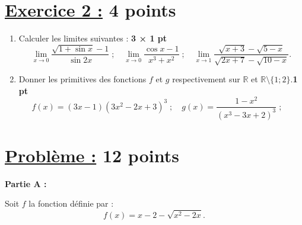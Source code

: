 \documentclass[12pt,a4paper]{article}
\begin{document}
\section*{\underline{Exercice 2 :} 4 points}

\begin{enumerate}
    \item Calculer les limites suivantes : \textbf{3 × 1 pt}
    \[
    \lim_{x \to 0} \frac{\sqrt{1+\sin x} -1}{\sin 2x} \; ; \quad
    \lim_{x \to 0} \frac{\cos x - 1}{x^3 + x^2} \; ; \quad
    \lim_{x \to 1} \frac{\sqrt{x + 3} - \sqrt{5 - x}}{\sqrt{2x + 7} - \sqrt{10 - x}}.
    \]
    \item Donner les primitives des fonctions $f$ et $g$ respectivement  sur $\mathbb{R}$ et $\mathbb{R}\setminus\{1;2\}$.\textbf{1 pt}
    \[
    f(x)=(3x-1)(3x^2-2x+3)^3 \; ; \quad
    g(x)=\frac{1-x^2}{(x^3-3x+2)^3} \; ; \quad
    \]
\end{enumerate}
\section*{\underline{Problème :} 12 points}

\textbf{Partie A :}

Soit \( f \) la fonction définie par :
\[
f(x) = x - 2 - \sqrt{x^2 - 2x}.
\]
\end{document}
